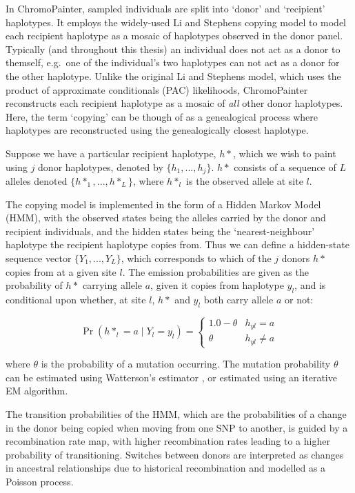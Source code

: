 In ChromoPainter, sampled individuals are split into `donor' and `recipient' haplotypes. It employs the widely-used Li and Stephens copying model \cite{Li2003} to model each recipient haplotype as a mosaic of haplotypes observed in the donor panel. Typically (and throughout this thesis) an individual does not act as a donor to themself, e.g.\ one of the individual's two haplotypes can not act as a donor for the other haplotype. Unlike the original Li and Stephens model, which uses the product of approximate conditionals (PAC) likelihoods, ChromoPainter reconstructs each recipient haplotype as a mosaic of \textit{all} other donor haplotypes. Here, the term `copying' can be though of as a genealogical process where haplotypes are reconstructed using the genealogically closest haplotype. 

Suppose we have a particular recipient haplotype, $h*$, which we wish to paint using $j$ donor haplotypes, denoted by $\{h_{1}, ..., h_{j}\}$. $h*$ consists of a sequence of $L$ alleles denoted $\{h*_{1}, ..., h*_{L}\}$, where $h*_{l}$ is the observed allele at site $l$.

The copying model is implemented in the form of a Hidden Markov Model (HMM), with the observed states being the alleles carried by the donor and recipient individuals, and the hidden states being the `nearest-neighbour' haplotype the recipient haplotype copies from. Thus we can define a hidden-state sequence vector $\{Y_{1}, ..., Y_{L}\}$, which corresponds to which of the $j$ donors $h*$ copies from at a given site $l$. The emission probabilities are given as the probability of $h*$ carrying allele $a$, given it copies from haplotype $y_{l}$, and is conditional upon whether, at site $l$,  $h*$ and $y_{l}$ both carry allele $a$ or not:

\begin{equation} \label{eq:cp}
\Pr(h*_{l} = a \mid Y_{l} = y_{l}) =     
	\begin{cases}
		1.0 - \theta & h_{yl} = a \\
		\theta & h_{yl} \neq a 
	\end{cases}       
\end{equation}

where $\theta$ is the probability of a mutation occurring. The mutation probability $\theta$ can be estimated using Watterson's estimator \cite{Watterson1975}, or estimated using an iterative EM algorithm.

The transition probabilities of the HMM, which are the probabilities of a change in the donor being copied when moving from one SNP to another, is guided by a recombination rate map, with higher recombination rates leading to a higher probability of transitioning. Switches between donors are interpreted as changes in ancestral relationships due to historical recombination and modelled as a Poisson process. 

